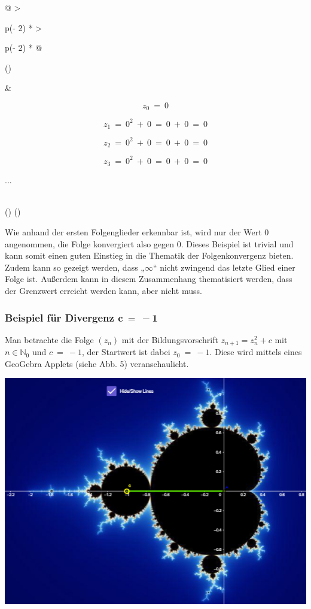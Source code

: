 \documentclass[a4paper, 12pt]{book}
\begin{document}
\begin{longtable}[]{@{}
  >{\raggedright\arraybackslash}p{(\columnwidth - 2\tabcolsep) * }
  >{\raggedright\arraybackslash}p{(\columnwidth - 2\tabcolsep) * }@{}}
\toprule()
\begin{minipage}[b]{\linewidth}\raggedright
\end{minipage} & \begin{minipage}[b]{\linewidth}\raggedright
\[z_{0}\  = \ 0\]

\[z_{1}\  = \ 0^{2}\  + \ 0\  = \ 0\  + \ 0\  = \ 0\]

\[z_{2}\  = \ 0^{2}\  + \ 0\  = \ 0\  + \ 0\  = \ 0\]

\[z_{3}\  = \ 0^{2}\  + \ 0\  = \ 0\  + \ 0\  = \ 0\]

...
\end{minipage} \\
\midrule()
\endhead
\bottomrule()
\end{longtable}

Wie anhand der ersten Folgenglieder erkennbar ist, wird nur der Wert 0
angenommen, die Folge konvergiert also gegen 0. Dieses Beispiel ist
trivial und kann somit einen guten Einstieg in die Thematik der
Folgenkonvergenz bieten. Zudem kann so gezeigt werden, dass
„\(\infty\)`` nicht zwingend das letzte Glied einer Folge ist. Außerdem
kann in diesem Zusammenhang thematisiert werden, dass der Grenzwert
erreicht werden kann, aber nicht muss.

\hypertarget{beispiel-fuxfcr-divergenz-mathbfc---1}{%
\subsubsection{\texorpdfstring{Beispiel für Divergenz
\(\mathbf{c\  = \  - 1}\)}{Beispiel für Divergenz \textbackslash mathbf\{c\textbackslash{}  = \textbackslash{}  - 1\}}}\label{beispiel-fuxfcr-divergenz-mathbfc---1}}

Man betrachte die Folge \(\left( z_{n} \right)\) mit der
Bildungsvorschrift \(z_{n + 1} = z_{n}^{2} + c\) mit
\(n \in \mathbb{N}_{0}\) und \(c\  = \  - 1\), der Startwert ist dabei
\(z_{0}\  = \  - 1\). Diese wird mittels eines GeoGebra Applets (siehe
Abb. 5) veranschaulicht.

\includegraphics[width=\linewidth]{image10.png}
\end{document}
